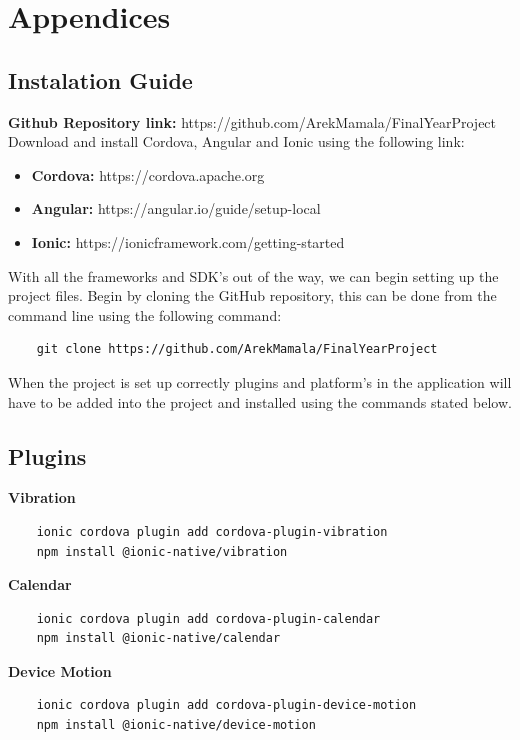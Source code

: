 \documentclass[a4paper,12pt]{report}
\begin{document}
\chapter{Appendices}

\section{Instalation Guide}
\textbf{Github Repository link:} https://github.com/ArekMamala/FinalYearProject \\

Download and install Cordova, Angular and Ionic using the following
link:
\begin{itemize}
    \item \textbf{Cordova: } https://cordova.apache.org
    \item \textbf{Angular: } https://angular.io/guide/setup-local
    \item \textbf{Ionic: } https://ionicframework.com/getting-started\\
\end{itemize}

With all the frameworks and SDK's out of the way, we can begin setting up
the project files. 
Begin by cloning the GitHub repository, this can be done from the command line using the following command:
\begin{lstlisting}
    git clone https://github.com/ArekMamala/FinalYearProject
\end{lstlisting}{}

When the project is set up correctly plugins and platform's in the application will have to be added into the project and installed using the commands stated below.\\
\section{Plugins}
\textbf{Vibration}
\begin{lstlisting}
    ionic cordova plugin add cordova-plugin-vibration
    npm install @ionic-native/vibration
\end{lstlisting}

\textbf{Calendar}
\begin{lstlisting}
    ionic cordova plugin add cordova-plugin-calendar
    npm install @ionic-native/calendar
\end{lstlisting}


\textbf{Device Motion}
\begin{lstlisting}
    ionic cordova plugin add cordova-plugin-device-motion
    npm install @ionic-native/device-motion
\end{lstlisting}{}
\end{document}
